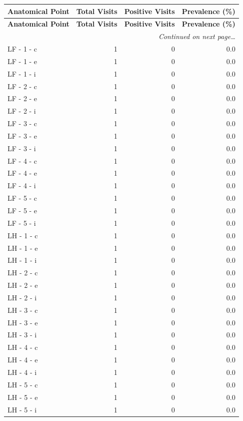 \documentclass[a4paper,11pt]{article}
\begin{document}
\begin{small}
\begin{longtable}{p{5cm}rrr}
\toprule
\textbf{Anatomical Point} &
\textbf{Total Visits} &
\textbf{Positive Visits} &
\textbf{Prevalence (\%)} \\
\midrule
\endfirsthead
\toprule
\textbf{Anatomical Point} &
\textbf{Total Visits} &
\textbf{Positive Visits} &
\textbf{Prevalence (\%)} \\
\midrule
\endhead
\midrule
\multicolumn{4}{r}{\small\emph{Continued on next page\ldots}} \\
\endfoot
\bottomrule
\endlastfoot
LF - 1 - c & 1 & 0 & 0.0 \\
LF - 1 - e & 1 & 0 & 0.0 \\
LF - 1 - i & 1 & 0 & 0.0 \\
LF - 2 - c & 1 & 0 & 0.0 \\
LF - 2 - e & 1 & 0 & 0.0 \\
LF - 2 - i & 1 & 0 & 0.0 \\
LF - 3 - c & 1 & 0 & 0.0 \\
LF - 3 - e & 1 & 0 & 0.0 \\
LF - 3 - i & 1 & 0 & 0.0 \\
LF - 4 - c & 1 & 0 & 0.0 \\
LF - 4 - e & 1 & 0 & 0.0 \\
LF - 4 - i & 1 & 0 & 0.0 \\
LF - 5 - c & 1 & 0 & 0.0 \\
LF - 5 - e & 1 & 0 & 0.0 \\
LF - 5 - i & 1 & 0 & 0.0 \\
LH - 1 - c & 1 & 0 & 0.0 \\
LH - 1 - e & 1 & 0 & 0.0 \\
LH - 1 - i & 1 & 0 & 0.0 \\
LH - 2 - c & 1 & 0 & 0.0 \\
LH - 2 - e & 1 & 0 & 0.0 \\
LH - 2 - i & 1 & 0 & 0.0 \\
LH - 3 - c & 1 & 0 & 0.0 \\
LH - 3 - e & 1 & 0 & 0.0 \\
LH - 3 - i & 1 & 0 & 0.0 \\
LH - 4 - c & 1 & 0 & 0.0 \\
LH - 4 - e & 1 & 0 & 0.0 \\
LH - 4 - i & 1 & 0 & 0.0 \\
LH - 5 - c & 1 & 0 & 0.0 \\
LH - 5 - e & 1 & 0 & 0.0 \\
LH - 5 - i & 1 & 0 & 0.0 \\

\end{longtable}
\end{small}
\end{document}
